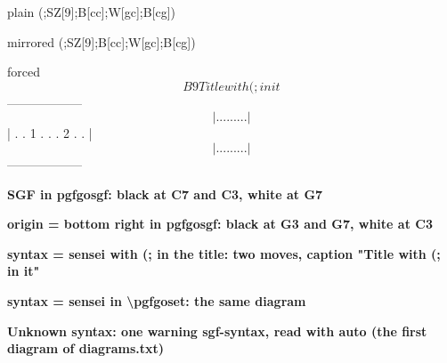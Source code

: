 \documentclass{article}
\newcommand\case[1]{\par\medskip\noindent\textbf{#1}\par\nopagebreak}
\begin{document}
\begin{pgfgosgf}{plain}
(;SZ[9];B[cc];W[gc];B[cg])
\end{pgfgosgf}

\begin{pgfgosgf}[origin = bottom right]{mirrored}
(;SZ[9];B[cc];W[gc];B[cg])
\end{pgfgosgf}

\begin{pgfgosgf}[syntax = sensei]{forced}
$$B9 Title with (; in it
$$  ------------------
$$ | . . . . . . . . . |
$$ | . . 1 . . . 2 . . |
$$ | . . . . . . . . . |
$$  ------------------
\end{pgfgosgf}

\case{SGF in pgfgosgf: black at C7 and C3, white at G7}
\begin{goban}[sgf size = plain, scale = 0.4]
\end{goban}

\case{origin = bottom right in pgfgosgf: black at G3 and G7, white at C3}
\begin{goban}[sgf size = mirrored, scale = 0.4]
\end{goban}

\case{syntax = sensei with (; in the title: two moves, caption "Title with (; in it"}

\case{syntax = sensei in \textbackslash pgfgoset: the same diagram}
\begingroup
{}
\endgroup

\case{Unknown syntax: one warning sgf-syntax, read with auto (the first diagram of diagrams.txt)}
\end{document}
